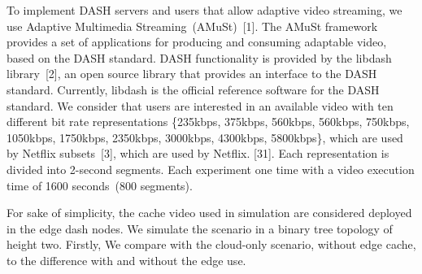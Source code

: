 
To implement DASH servers and users that allow adaptive video streaming, we use Adaptive Multimedia Streaming~(AMuSt)~[1]. The AMuSt framework provides a set of applications for producing and consuming adaptable video, based on the DASH standard. DASH functionality is provided by the libdash library~[2], an open source library that provides an interface to the DASH standard. Currently, libdash is the official reference software for the DASH standard. We consider that users are interested in an available video with ten different bit rate representations \{235kbps, 375kbps, 560kbps, 560kbps, 750kbps, 1050kbps, 1750kbps, 2350kbps, 3000kbps, 4300kbps, 5800kbps\}, which are used by Netflix subsets~[3], which are used by Netflix. [31]. Each representation is divided into 2-second segments. Each experiment one time with a video execution time of 1600 seconds~(800 segments). %


For sake of simplicity, the cache video used in simulation are considered deployed in the edge dash nodes.
We simulate the scenario in a binary tree topology of height two. Firstly, We compare with the cloud-only scenario, without edge cache, to the difference with and without the edge use.



